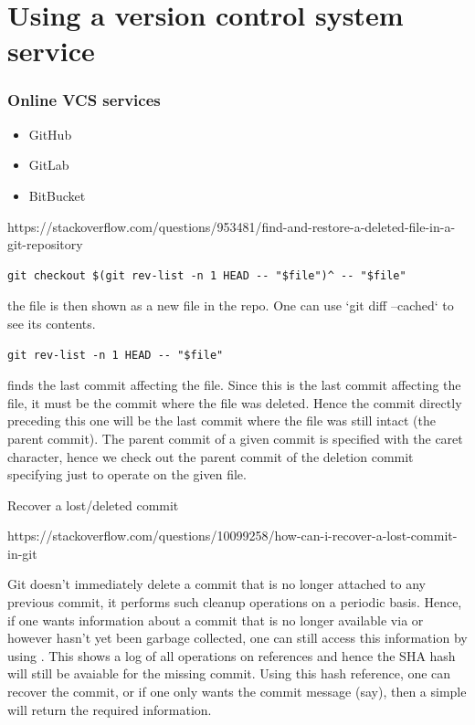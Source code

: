 \documentclass{git_course}
\begin{document}
\section{Using a version control system service}

\begin{frame}
    \frametitle{Online VCS services}
    \begin{itemize}
        \item GitHub
        \item GitLab
        \item BitBucket
    \end{itemize}
\end{frame}


https://stackoverflow.com/questions/953481/find-and-restore-a-deleted-file-in-a-git-repository

\begin{verbatim}
git checkout $(git rev-list -n 1 HEAD -- "$file")^ -- "$file"
\end{verbatim}

the file is then shown as a new file in the repo.  One can use `git diff
--cached` to see its contents.

\begin{verbatim}
git rev-list -n 1 HEAD -- "$file"
\end{verbatim}

finds the last commit affecting the file.  Since this is the last commit
affecting the file, it must be the commit where the file was deleted.  Hence
the commit directly preceding this one will be the last commit where the
file was still intact (the parent commit).  The parent commit of a given
commit is specified with the caret \ttt{\^} character, hence we check out
the parent commit of the deletion commit specifying just to operate on the
given file.



Recover a lost/deleted commit

https://stackoverflow.com/questions/10099258/how-can-i-recover-a-lost-commit-in-git

Git doesn't immediately delete a commit that is no longer attached to any
previous commit, it performs such cleanup operations on a periodic basis.
Hence, if one wants information about a commit that is no longer available
via  or  however hasn't yet been garbage collected,
one can still access this information by using .  This shows
a log of all operations on references and hence the SHA hash will still be
avaiable for the missing commit.  Using this hash reference, one can recover
the commit, or if one only wants the commit message (say), then a simple
 will return the required information.
\end{document}
